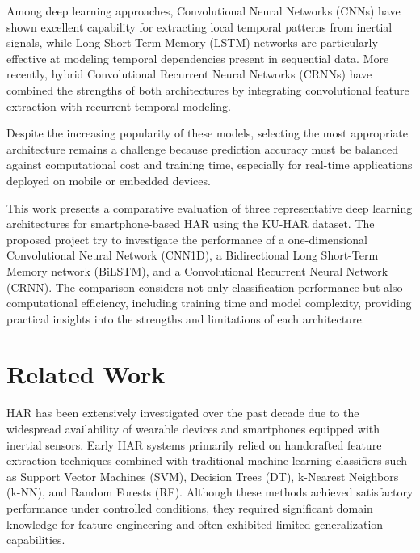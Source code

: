 \documentclass[journal]{IEEEtran}
\begin{document}
Among deep learning approaches, Convolutional Neural Networks (CNNs) have shown excellent capability for extracting local temporal patterns from inertial signals, while Long Short-Term Memory (LSTM) networks are particularly effective at modeling temporal dependencies present in sequential data. More recently, hybrid Convolutional Recurrent Neural Networks (CRNNs) have combined the strengths of both architectures by integrating convolutional feature extraction with recurrent temporal modeling.

Despite the increasing popularity of these models, selecting the most appropriate architecture remains a challenge because prediction accuracy must be balanced against computational cost and training time, especially for real-time applications deployed on mobile or embedded devices.

This work presents a comparative evaluation of three representative deep learning architectures for smartphone-based HAR using the KU-HAR dataset. The proposed project try to investigate the performance of a one-dimensional Convolutional Neural Network (CNN1D), a Bidirectional Long Short-Term Memory network (BiLSTM), and a Convolutional Recurrent Neural Network (CRNN). The comparison considers not only classification performance but also computational efficiency, including training time and model complexity, providing practical insights into the strengths and limitations of each architecture.







 

\section{Related Work}

HAR has been extensively investigated over the past decade due to the widespread availability of wearable devices and smartphones equipped with inertial sensors. Early HAR systems primarily relied on handcrafted feature extraction techniques combined with traditional machine learning classifiers such as Support Vector Machines (SVM), Decision Trees (DT), k-Nearest Neighbors (k-NN), and Random Forests (RF). Although these methods achieved satisfactory performance under controlled conditions, they required significant domain knowledge for feature engineering and often exhibited limited generalization capabilities.
\end{document}
